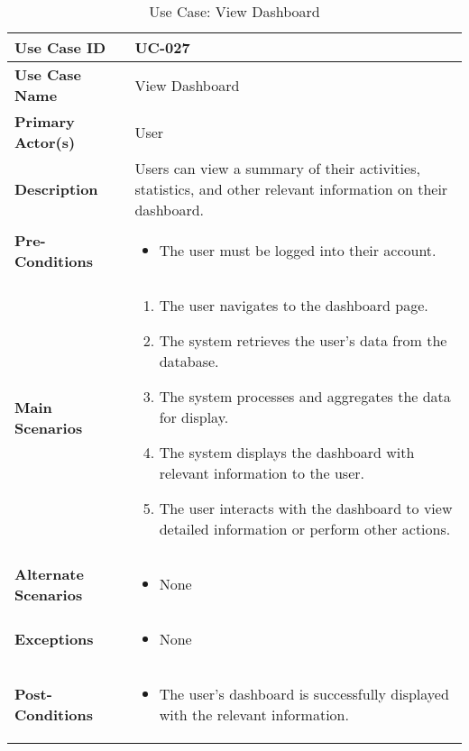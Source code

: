 \begin{table}[!ht]
    \centering
    \renewcommand{\arraystretch}{1.3} %
    \begin{tabularx}{\textwidth}{|l|X|}
        \hline
        \textbf{Use Case ID} & UC-027 \\
        \hline
        \textbf{Use Case Name} & View Dashboard \\
        \hline
        \textbf{Primary Actor(s)} & User \\
        \hline
        \textbf{Description} & Users can view a summary of their activities, statistics, and other relevant information on their dashboard. \\
        \hline
        \textbf{Pre-Conditions} & 
        \begin{itemize}[label=--,itemsep=0pt]
            \item The user must be logged into their account.
        \end{itemize} \\
        \hline
        \textbf{Main Scenarios} & 
        \begin{enumerate}[label=\arabic*.,itemsep=0pt]
            \item The user navigates to the dashboard page.
            \item The system retrieves the user's data from the database.
            \item The system processes and aggregates the data for display.
            \item The system displays the dashboard with relevant information to the user.
            \item The user interacts with the dashboard to view detailed information or perform other actions.
        \end{enumerate} \\
        \hline
        \textbf{Alternate Scenarios} & 
        \begin{itemize}[label=--,itemsep=0pt]
            \item None
        \end{itemize} \\
        \hline
        \textbf{Exceptions} & 
        \begin{itemize}[label=--,itemsep=0pt]
            \item None
        \end{itemize} \\
        \hline
        \textbf{Post-Conditions} & 
        \begin{itemize}[label=--,itemsep=0pt]
            \item The user's dashboard is successfully displayed with the relevant information.
        \end{itemize} \\
        \hline
    \end{tabularx}
    \caption{Use Case: View Dashboard}
    \label{tab:use-case-view-dashboard}
\end{table}


